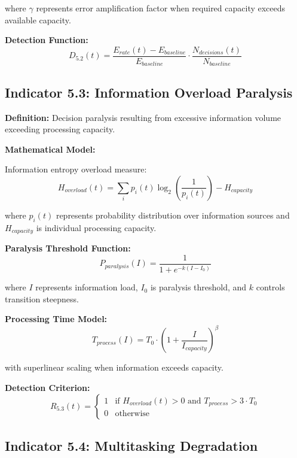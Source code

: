 \documentclass[11pt,a4paper]{article}
\begin{document}
where $\gamma$ represents error amplification factor when required capacity exceeds available capacity.

\textbf{Detection Function:}
\begin{equation}
D_{5.2}(t) = \frac{E_{rate}(t) - E_{baseline}}{E_{baseline}} \cdot \frac{N_{decisions}(t)}{N_{baseline}}
\end{equation}

\subsection{Indicator 5.3: Information Overload Paralysis}

\textbf{Definition:} Decision paralysis resulting from excessive information volume exceeding processing capacity.

\textbf{Mathematical Model:}

Information entropy overload measure:
\begin{equation}
H_{overload}(t) = \sum_{i} p_i(t) \log_2\left(\frac{1}{p_i(t)}\right) - H_{capacity}
\end{equation}

where $p_i(t)$ represents probability distribution over information sources and $H_{capacity}$ is individual processing capacity.

\textbf{Paralysis Threshold Function:}
\begin{equation}
P_{paralysis}(I) = \frac{1}{1 + e^{-k(I - I_0)}}
\end{equation}

where $I$ represents information load, $I_0$ is paralysis threshold, and $k$ controls transition steepness.

\textbf{Processing Time Model:}
\begin{equation}
T_{process}(I) = T_0 \cdot \left(1 + \frac{I}{I_{capacity}}\right)^{\beta}
\end{equation}

with superlinear scaling when information exceeds capacity.

\textbf{Detection Criterion:}
\begin{equation}
R_{5.3}(t) = \begin{cases}
1 & \text{if } H_{overload}(t) > 0 \text{ and } T_{process} > 3 \cdot T_0 \\
0 & \text{otherwise}
\end{cases}
\end{equation}

\subsection{Indicator 5.4: Multitasking Degradation}
\end{document}
